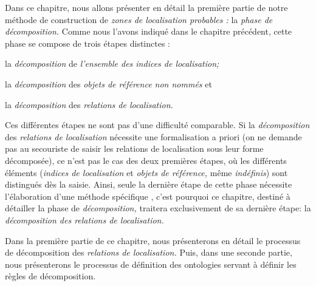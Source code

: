 Dans ce chapitre, nous allons présenter en détail la première partie
de notre méthode de construction de \emph{zones de localisation
  probables :} la \emph{phase de décomposition.} Comme nous l'avons
indiqué dans le chapitre précédent, cette phase se compose de trois
étapes distinctes :
%
\begin{enumerate*}[label=(\alph*)]
\item la \emph{décomposition} de \emph{l'ensemble des indices de
    localisation;}
\item la \emph{décomposition} des \emph{objets de référence non
    nommés} et
\item la \emph{décomposition} des \emph{relations de localisation.}
\end{enumerate*}
%
Ces différentes étapes ne sont pas d'une difficulté comparable. Si la
\emph{décomposition} des \emph{relations de localisation} nécessite
une formalisation a priori (on ne demande pas au secouriste de saisir
les relations de localisation sous leur forme décomposée), ce n'est
pas le cas des deux premières étapes, où les différents éléments
(\emph{indices de localisation} et \emph{objets de référence,} même
\emph{indéfinis}) sont distingués dès la saisie. Ainsi, seule la
dernière étape de cette phase nécessite l’élaboration d'une méthode
spécifique , c'est pourquoi ce chapitre, destiné à détailler la phase
de \emph{décomposition,} traitera exclusivement de sa dernière étape:
la \emph{décomposition des relations de localisation.}

Dans la première partie de ce chapitre, nous présenterons en détail le
processus de décomposition des \emph{relations de localisation.} Puis,
dans une seconde partie, nous présenterons le processus de définition
des ontologies servant à définir les règles de décomposition.

